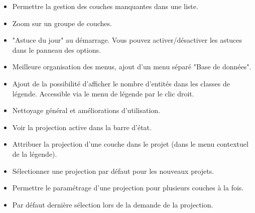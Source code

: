 \begin{itemize}[label=--]
\item Permettre la gestion des couches manquantes dans une liste. 
\item Zoom sur un groupe de couches. 
\item "Astuce du jour" au démarrage. Vous pouvez activer/désactiver les astuces 
dans le panneau des options. 
\item Meilleure organisation des menus, ajout d'un menu séparé "Base de données". 
\item Ajout de la possibilité d'afficher le nombre d'entités dans les classes de 
légende. Accessible via le menu de légende par le clic droit.
\item Nettoyage général et améliorations d'utilisation.
\end{itemize}


\begin{itemize}[label=--]
\item Voir la projection active dans la barre d'état. 
\item Attribuer la projection d'une couche dans le projet (dans le menu contextuel 
de la légende). 
\item Sélectionner une projection par défaut pour les nouveaux projets. 
\item Permettre le paramétrage d'une projection pour plusieurs couches à la fois. 
\item Par défaut dernière sélection lors de la demande de la projection. 
\end{itemize}

